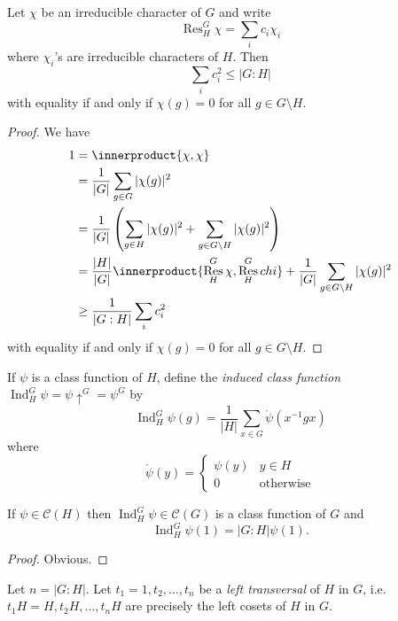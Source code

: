 \documentclass[a4paper]{article}
\newcommand*{\ip}{\innerproduct} %
\DeclareMathOperator{\Res}{Res} %
\DeclareMathOperator{\Ind}{Ind} %
\theoremstyle{definition}
\begin{document}
\begin{lemma}
  Let \(\chi\) be an irreducible character of \(G\) and write
  \[
    \Res_H^G \chi = \sum_i c_i \chi_i
  \]
  where \(\chi_i\)'s are irreducible characters of \(H\). Then
  \[
    \sum_i c_i^2 \leq |G:H|
  \]
  with equality if and only if \(\chi(g) = 0\) for all \(g \in G \setminus H\).
\end{lemma}

\begin{proof}
  We have
  \begin{align*}
    1
    &= \ip{\chi, \chi} \\
    &= \frac{1}{|G|} \sum_{g \in G} |\chi(g)|^2 \\
    &= \frac{1}{|G|} \left(\sum_{g \in H} |\chi(g)|^2 + \sum_{g \in G \setminus H} |\chi(g)|^2 \right) \\
    &= \frac{|H|}{|G|} \ip{\Res_H^G \chi, \Res_H^G chi} + \frac{1}{|G|} \sum_{g \in G \setminus H} |\chi(g)|^2 \\
    &\geq \frac{1}{|G:H|} \sum_i c_i^2
  \end{align*}
  with equality if and only if \(\chi(g) = 0\) for all \(g \in G \setminus H\).
\end{proof}

\begin{definition}[induction]
  If \(\psi\) is a class function of \(H\), define the \emph{induced class function} \(\Ind_H^G \psi = \psi \uparrow^G = \psi^G\) by
  \[
    \Ind_H^G \psi (g) = \frac{1}{|H|} \sum_{x \in G} \ocirc \psi(x^{-1} gx)
  \]
  where
  \[
    \ocirc \psi(y) =
    \begin{cases}
      \psi(y) & y \in H \\
      0 & \text{otherwise}
    \end{cases}
  \]
\end{definition}

\begin{lemma}
  If \(\psi \in \mathcal C(H)\) then \(\Ind_H^G \psi \in \mathcal C(G)\) is a class function of \(G\) and
  \[
    \Ind_H^G \psi(1) = |G:H| \psi(1).
  \]
\end{lemma}

\begin{proof}
  Obvious.
\end{proof}

Let \(n = |G:H|\). Let \(t_1 = 1, t_2, \dots, t_n\) be a \emph{left transversal} of \(H\) in \(G\), i.e.\ \(t_1H = H, t_2H, \dots, t_nH\) are precisely the left cosets of \(H\) in \(G\).
\end{document}
